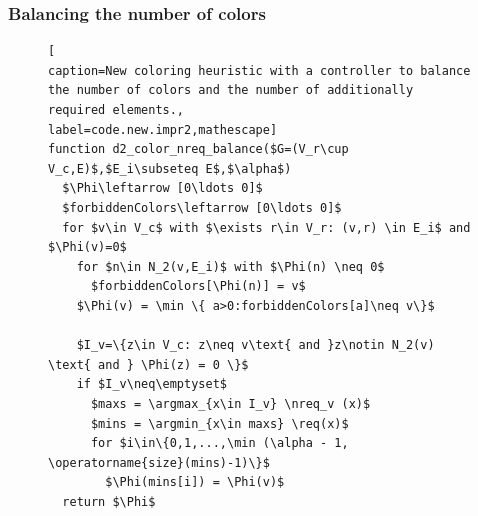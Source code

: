 \documentclass{beamer}
\DeclareMathOperator*{\argmin}{arg\,min}
\DeclareMathOperator*{\argmax}{arg\,max}
\newcommand{\nreq}{L}
\newcommand{\req}{M}
\begin{document}
\begin{frame}[fragile]
\frametitle{Balancing the number of colors}
\begin{figure}
\begin{lstlisting}[
caption=New coloring heuristic with a controller to balance
the number of colors and the number of additionally required elements.,
label=code.new.impr2,mathescape]
function d2_color_nreq_balance($G=(V_r\cup V_c,E)$,$E_i\subseteq E$,$\alpha$)
  $\Phi\leftarrow [0\ldots 0]$
  $forbiddenColors\leftarrow [0\ldots 0]$
  for $v\in V_c$ with $\exists r\in V_r: (v,r) \in E_i$ and $\Phi(v)=0$
    for $n\in N_2(v,E_i)$ with $\Phi(n) \neq 0$
      $forbiddenColors[\Phi(n)] = v$
    $\Phi(v) = \min \{ a>0:forbiddenColors[a]\neq v\}$

    $I_v=\{z\in V_c: z\neq v\text{ and }z\notin N_2(v) \text{ and } \Phi(z) = 0 \}$
    if $I_v\neq\emptyset$
      $maxs = \argmax_{x\in I_v} \nreq_v (x)$
      $mins = \argmin_{x\in maxs} \req(x)$
      for $i\in\{0,1,...,\min (\alpha - 1, \operatorname{size}(mins)-1)\}$
        $\Phi(mins[i]) = \Phi(v)$
  return $\Phi$
\end{lstlisting}
\end{figure}
\end{frame}


\end{document}
